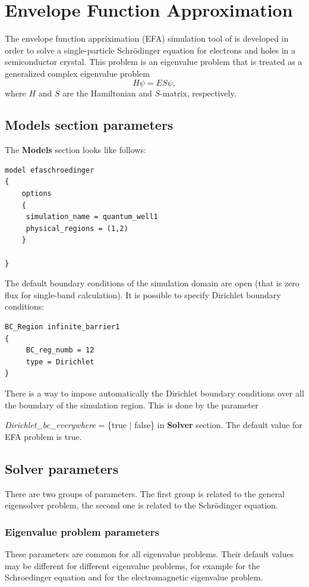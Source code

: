 \chapter{Envelope Function Approximation}
The envelope function appriximation (EFA) simulation tool of \tibercad{} is developed in order to solve a single-particle Schr\"odinger equation for electrons and holes in a semiconductor crystal.
This problem is an eigenvalue problem that is treated as a generalized complex eigenvalue problem 
\begin{equation}
	H\psi  = E S \psi,
\end{equation}
where $H$ and $S$ are the Hamiltonian and $S$-matrix, respectively.


\section{Models section parameters}
The {\bf Models} section looks like follows:
\begin{verbatim}
model efaschroedinger
{
    options
    {
     simulation_name = quantum_well1
     physical_regions = (1,2)
    }

}
\end{verbatim}

The default boundary conditions of the simulation domain  are open (that is  zero flux for single-band calculation).
It is possible to specify Dirichlet boundary conditions:
 \begin{verbatim}
BC_Region infinite_barrier1
{
     BC_reg_numb = 12
     type = Dirichlet
}
\end{verbatim}

There is a way to impose automatically the Dirichlet boundary conditions over all the boundary of the simulation region. This is done by the parameter

\textit{Dirichlet\_bc\_everywhere} = \{true $\vert$ false\} in \textbf{Solver} section. The default value for EFA problem is true.

\section{Solver parameters}

There are two groups of parameters. The first  group is related to the general eigensolver problem, the second one is related to the Schr\"odinger equation.
\subsection{Eigenvalue problem parameters}
These parameters are common for all eigenvalue problems. Their default values may be different for different eigenvalue problems, for example for the Schroedinger equation and for the electromagnetic eigenvalue problem.
 
